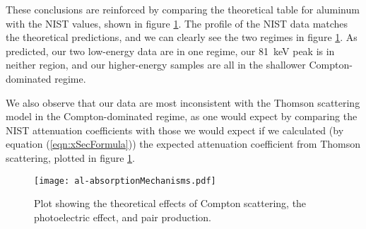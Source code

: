 \documentclass[letter]{article}
\begin{document}
These conclusions are reinforced by comparing the theoretical table for aluminum with the NIST values, shown in figure \ref{fig:AttenComp}. The profile of the NIST data matches the theoretical predictions, and we can clearly see the two regimes in figure \ref{fig:AttenComp}. As predicted, our two low-energy data are in one regime, our \qty{81}{\kilo\electronvolt} peak is in neither region, and our higher-energy samples are all in the shallower Compton-dominated regime.

We also observe that our data are most inconsistent with the Thomson scattering model in the Compton-dominated regime, as one would expect by comparing the NIST attenuation coefficients with those we would expect if we calculated (by equation (\ref{eqn:xSecFormula})) the expected attenuation coefficient from Thomson scattering, plotted in figure \ref{fig:AttenComp}.


\begin{figure}[p] \centering
    \texttt{[image: al-absorptionMechanisms.pdf]}
    \caption{Plot showing the theoretical effects of Compton scattering, the photoelectric effect, and pair production.}
    \label{fig:AttenComp}
\end{figure}
\end{document}
